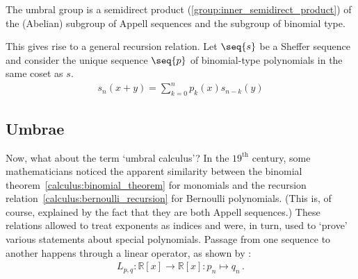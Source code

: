 
    \begin{property}
        The umbral group is a semidirect product (\cref{group:inner_semidirect_product}) of the (Abelian) subgroup of Appell sequences and the subgroup of binomial type.

        This gives rise to a general recursion relation. Let $\seq{s}$ be a Sheffer sequence and consider the unique sequence $\seq{p}$ of binomial-type polynomials in the same coset as $s$.
        \begin{gather}
            s_n(x+y) = \sum_{k=0}^np_k(x)s_{n-k}(y)
        \end{gather}
    \end{property}

\subsection{Umbrae}

    Now, what about the term `umbral calculus'? In the $19^{\text{th}}$ century, some mathematicians noticed the apparent similarity between the binomial theorem~\ref{calculus:binomial_theorem} for monomials and the recursion relation~\ref{calculus:bernoulli_recursion} for Bernoulli polynomials. (This is, of course, explained by the fact that they are both Appell sequences.) These relations allowed to treat exponents as indices and were, in turn, used to `prove' various statements about special polynomials. Passage from one sequence to another happens through a linear operator, as shown by :
    \begin{gather}
        L_{p,q}:\mathbb{R}[x]\rightarrow\mathbb{R}[x]:p_n\mapsto q_n\,.
    \end{gather}


